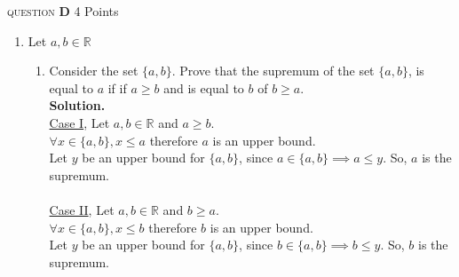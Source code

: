 \documentclass[11pt]{article}
\newcommand{\problem
}[2]{
\begin{mdframed}
    \textsc{question} \textbf{#1} \hfill #2
\end{mdframed}
}
\begin{document}
\newpage
\problem{D}{4 Points}
\begin{enumerate}
	\item Let $a, b \in \mathbb{R}$
	      \begin{enumerate}
		      \item Consider the set $\{a, b\}$. Prove that the supremum of the set $\{a, b\}$, is equal to $a$ if if $a \geq b$ and is equal to $b$ of $b \geq a$.
		            \\
		            \textbf{Solution.} \\
		            \underline{Case I}, Let $a, b \in \mathbb{R}$ and $a \geq b$.
		            \\
		            $\forall x \in \{a, b\}, x \leq a$ therefore $a$ is an upper bound.\\
		            Let $y$ be an upper bound for $\{a, b\}$, since $a \in \{a, b\} \implies a \leq y$. So, $a$ is the supremum.\\
		            \\
		            \underline{Case II}, Let $a, b \in \mathbb{R}$ and $b \geq a$.
		            \\
		            $\forall x \in \{a, b\}, x \leq b$ therefore $b$ is an upper bound.\\
		            Let $y$ be an upper bound for $\{a, b\}$, since $b \in \{a, b\} \implies b \leq y$. So, $b$ is the supremum.\\


\end{enumerate}
\end{enumerate}
\end{document}
